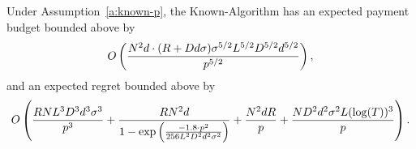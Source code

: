 \begin{theorem}
\label{rst:known-p}
Under Assumption~\ref{a:known-p}, the Known-\MinProb Algorithm has an expected payment budget bounded above by 
\begin{align*}
O \left(\frac{N^2 d \cdot (R + D d \sigma)\sigma^{5/2}L^{5/2}D^{5/2}d^{5/2}}{p^{5/2}} \right),
\end{align*}
and an expected regret bounded above by
\begin{align*}
O \left(\frac{R N L^3 D^3 d^3 \sigma^3}{p^3}
  + \frac{R N^2 d}{1 - \exp \left(
    \frac{-1.8 \cdot p^2}{256 L^2 D^2 d^2 \sigma^2}
  \right)} +\frac{N^2 dR}{p}+\frac{ND^2 d^2\sigma^2 L(\log(T))^3}{p}\right).
\end{align*}
\end{theorem}

